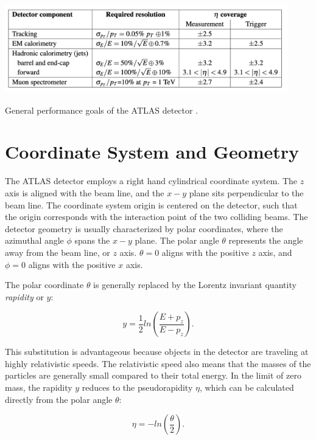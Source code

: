 \begin{table}[!htbp]
	\centering
	\includegraphics[width=0.92\textwidth]{figures/ch4/atlas_requirements}
	\caption{General performance goals of the ATLAS detector \cite{atlas_overview}.
	\label{tab:atlas_requirements}}
\end{table}

\section{Coordinate System and Geometry}

\indent The ATLAS detector employs a right hand cylindrical coordinate system. The $z$ axis is aligned with the beam line, and the $x-y$ plane sits perpendicular to the beam line. The coordinate system origin is centered on the detector, such that the origin corresponds with the interaction point of the two colliding beams. The detector geometry is usually characterized by polar coordinates, where the azimuthal angle $\phi$ spans the $x-y$ plane. The polar angle $\theta$ represents the angle away from the beam line, or $z$ axis. $\theta = 0$ aligns with the positive $z$ axis, and $\phi = 0$ aligns with the positive $x$ axis. \par

\indent The polar coordinate $\theta$ is generally replaced by the Lorentz invariant quantity \textit{rapidity} or $y$:

\begin{equation}
	y = \frac{1}{2} ln(\frac{E+p_z}{E-p_z}) .
\end{equation}

This substitution is advantageous because objects in the detector are traveling at highly relativistic speeds. The relativistic speed also means that the masses of the particles are generally small compared to their total energy. In the limit of zero mass, the rapidity $y$ reduces to the pseudorapidity $\eta$, which can be calculated directly from the polar angle $\theta$:

\begin{equation}
	\eta = -ln(\frac{\theta}{2}) .
\end{equation}

